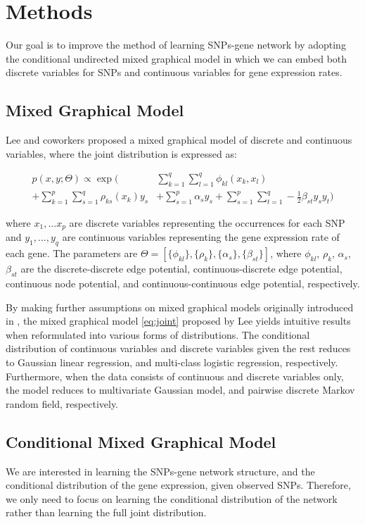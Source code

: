 \documentclass{article}
\begin{document}
\section{Methods}
\label{Methods}
Our goal is to improve the method of learning SNPs-gene network by adopting the conditional undirected mixed graphical model in which we can embed both discrete variables for SNPs and continuous variables for gene expression rates.

\subsection{Mixed Graphical Model}
Lee and coworkers \cite{lee2013structure} proposed a mixed graphical model of discrete and continuous variables, where the joint distribution is expressed as:

\begin{align}
p(x, y ; \Theta) \propto \exp \Big( &\sum_{k=1}^{q} \sum_{l=1}^{q} \phi_{kl} (x_k, x_l) \nonumber \\
+ \sum_{k=1}^{p} \sum_{s=1}^{q} \rho_{ks}(x_k) y_s  &+ \sum_{s=1}^{p} \alpha_s y_s + \sum_{s=1}^{p} \sum_{t=1}^{q} -\frac{1}{2} \beta_{st} y_s y_t \Big) \label{eq:joint}
\end{align} 

where $x_1, ... x_p$ are discrete variables representing the occurrences for each SNP and $y_1, ..., y_q$ are continuous variables representing the gene expression rate of each gene. 
The parameters are $\Theta = [\{\phi_{kl}\}, \{\rho_{k}\}, \{\alpha_{s}\}, \{\beta_{st}\}]$, where $\phi_{kl}$, $\rho_{k}$, $\alpha_{s}$, $\beta_{st}$ are the discrete-discrete edge potential, continuous-discrete edge potential, continuous node potential, and continuous-continuous edge potential, respectively.

By making further assumptions on mixed graphical models originally introduced in \cite{lauritzen1989graphical}, the mixed graphical model \ref{eq:joint} proposed by Lee \cite{lee2013structure} yields intuitive results when reformulated into various forms of distributions. The conditional distribution of continuous variables and discrete variables given the rest reduces to Gaussian linear regression, and multi-class logistic regression, respectively. Furthermore, when the data consists of continuous and discrete variables only, the model reduces to multivariate Gaussian model, and pairwise discrete Markov random field, respectively. 

\subsection{Conditional Mixed Graphical Model}
We are interested in learning the SNPs-gene network structure, and the conditional distribution of the gene expression, given observed SNPs.
Therefore, we only need to focus on learning the conditional distribution of the network rather than learning the full joint distribution. 
\end{document}
